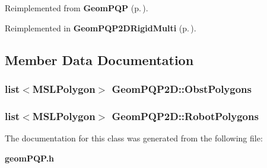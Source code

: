 Reimplemented from {\bf Geom\-PQP} {\rm (p.\,\pageref{class_GeomPQP_a3})}.

Reimplemented in {\bf Geom\-PQP2DRigid\-Multi} {\rm (p.\,\pageref{class_GeomPQP2DRigidMulti_a4})}.

\subsection{Member Data Documentation}
\subsubsection{\setlength{\rightskip}{0pt plus 5cm}list$<${\bf MSLPolygon}$>$ Geom\-PQP2D::Obst\-Polygons}\label{class_GeomPQP2D_m0}


\subsubsection{\setlength{\rightskip}{0pt plus 5cm}list$<${\bf MSLPolygon}$>$ Geom\-PQP2D::Robot\-Polygons}\label{class_GeomPQP2D_m1}




The documentation for this class was generated from the following file:\begin{CompactItemize}
\item 
{\bf geom\-PQP.h}\end{CompactItemize}
